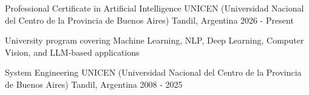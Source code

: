 
\begin{cventries}
\cventry
{Professional Certificate in Artificial Intelligence} %
{UNICEN (Universidad Nacional del Centro de la Provincia de Buenos Aires)} %
{Tandil, Argentina} %
{2026 - Present} %
{
\begin{cvitems}
  \item {University program covering Machine Learning, NLP, Deep Learning, Computer Vision, and LLM-based applications}
\end{cvitems}
}

\cventry
{System Engineering} %
{UNICEN (Universidad Nacional del Centro de la Provincia de Buenos Aires)} %
{Tandil, Argentina} %
{2008 - 2025} %
{}

\end{cventries}
